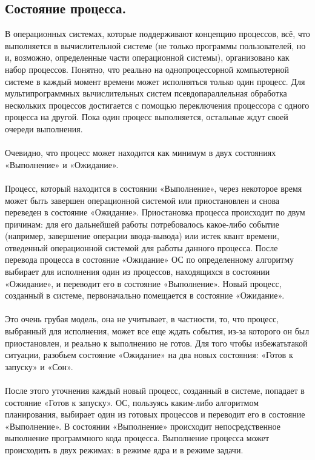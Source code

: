 \documentclass[a4paper]{article}
\begin{document}
\subsection{\Large Состояние процесса.}
\rm В операционных системах, которые поддерживают концепцию процессов, всё, что выполняется в вычислительной системе (не только программы пользователей, но и, возможно, определенные части операционной системы), организовано как набор процессов. Понятно, что реально на однопроцессорной компьютерной системе в каждый момент времени может исполняться только один процесс. Для мультипрограммных вычислительных систем псевдопараллельная обработка нескольких процессов достигается с помощью переключения процессора с одного процесса на другой. Пока один процесс выполняется, остальные ждут своей очереди выполнения.\\\\
Очевидно, что процесс может находится как минимум в двух состояниях «Выполнение» и «Ожидание».\\\\
Процесс, который находится в состоянии «Выполнение», через некоторое время может быть завершен операционной системой или приостановлен и снова переведен в состояние «Ожидание». Приостановка процесса происходит по двум причинам: для его дальнейшей работы потребовалось какое-либо событие (например, завершение операции ввода-вывода) или истек квант времени, отведенный операционной системой для работы данного процесса. После перевода процесса в состояние «Ожидание» ОС по определенному алгоритму выбирает для исполнения один из процессов, находящихся в состоянии «Ожидание», и переводит его в состояние «Выполнение». Новый процесс, созданный в системе, первоначально помещается в состояние «Ожидание».\\\\
Это очень грубая модель, она не учитывает, в частности, то, что процесс, выбранный для исполнения, может все еще ждать события, из-за которого он был приостановлен, и реально к выполнению не готов. Для того чтобы избежатьтакой ситуации, разобьем состояние «Ожидание» на два новых состояния: «Готов к запуску» и «Сон».\\\\
После этого уточнения каждый новый процесс, созданный в системе, попадает в состояние «Готов к запуску». ОС, пользуясь каким-либо алгоритмом планирования, выбирает один из готовых процессов и переводит его в состояние «Выполнение». В состоянии «Выполнение» происходит непосредственное выполнение программного кода процесса. Выполнение процесса может происходить в двух режимах: в режиме ядра и в режиме задачи.\\\\
\end{document}
